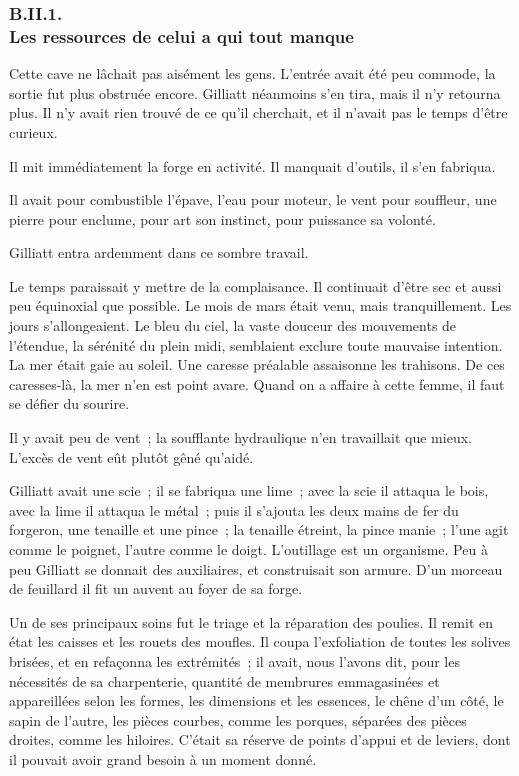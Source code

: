 \documentclass[french,twoside]{book} %
\begin{document}
  \subsubsection[{B.II.1. Les ressources de celui a qui tout manque}]{B.II.1. \\
Les ressources de celui a qui tout manque}
\noindent Cette cave ne lâchait pas aisément les gens. L’entrée avait été peu commode, la sortie fut plus obstruée encore. Gilliatt néanmoins s’en tira, mais il n’y retourna plus. Il n’y avait rien trouvé de ce qu’il cherchait, et il n’avait pas le temps d’être curieux.\par
Il mit immédiatement la forge en activité. Il manquait d’outils, il s’en fabriqua.\par
Il avait pour combustible l’épave, l’eau pour moteur, le vent pour souffleur, une pierre pour enclume, pour art son instinct, pour puissance sa volonté.\par
Gilliatt entra ardemment dans ce sombre travail.\par
Le temps paraissait y mettre de la complaisance. Il continuait d’être sec et aussi peu équinoxial que possible. Le mois de mars était venu, mais tranquillement. Les jours s’allongeaient. Le bleu du ciel, la vaste douceur des mouvements de l’étendue, la sérénité du plein  midi, semblaient exclure toute mauvaise intention. La mer était gaie au soleil. Une caresse préalable assaisonne les trahisons. De ces caresses-là, la mer n’en est point avare. Quand on a affaire à cette femme, il faut se défier du sourire.\par
Il y avait peu de vent ; la soufflante hydraulique n’en travaillait que mieux. L’excès de vent eût plutôt gêné qu’aidé.\par
Gilliatt avait une scie ; il se fabriqua une lime ; avec la scie il attaqua le bois, avec la lime il attaqua le métal ; puis il s’ajouta les deux mains de fer du forgeron, une tenaille et une pince ; la tenaille étreint, la pince manie ; l’une agit comme le poignet, l’autre comme le doigt. L’outillage est un organisme. Peu à peu Gilliatt se donnait des auxiliaires, et construisait son armure. D’un morceau de feuillard il fit un auvent au foyer de sa forge.\par
Un de ses principaux soins fut le triage et la réparation des poulies. Il remit en état les caisses et les rouets des moufles. Il coupa l’exfoliation de toutes les solives brisées, et en refaçonna les extrémités ; il avait, nous l’avons dit, pour les nécessités de sa charpenterie, quantité de membrures emmagasinées et appareillées selon les formes, les dimensions et les essences, le chêne d’un côté, le sapin de l’autre, les pièces courbes, comme les porques, séparées des pièces droites, comme les hiloires. C’était sa réserve de points d’appui et de leviers, dont il pouvait avoir grand besoin à un moment donné.\par
\end{document}
